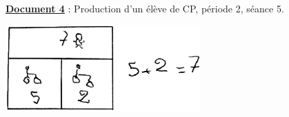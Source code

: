 \ \\

{\bf\uline{Document 4}} : Production d'un élève de CP, période 2, séance 5. \\

\qquad
\begin{minipage}{8cm}
   \includegraphics[width=7.5cm]{Nombres_et_calculs_did/Images/Num2_crpe_velos_bis}
\end{minipage}



\analyses

